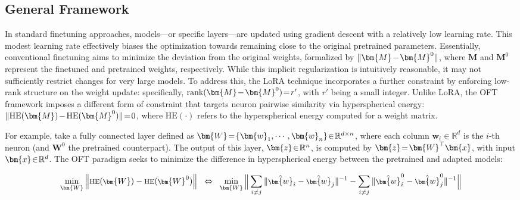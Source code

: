 \subsection{General Framework}

In standard finetuning approaches, models—or specific layers—are updated using gradient descent with a relatively low learning rate. This modest learning rate effectively biases the optimization towards remaining close to the original pretrained parameters. Essentially, conventional finetuning aims to minimize the deviation from the original weights, formalized by $\thickmuskip=2mu \medmuskip=2mu \| \bm{M} - \bm{M}^0\|$, where $\bm{M}$ and $\bm{M}^0$ represent the finetuned and pretrained weights, respectively. While this implicit regularization is intuitively reasonable, it may not sufficiently restrict changes for very large models. To address this, the LoRA technique incorporates a further constraint by enforcing low-rank structure on the weight update: specifically, $\thickmuskip=2mu \medmuskip=2mu \text{rank}(\bm{M} - \bm{M}^0)=r'$, with $r'$ being a small integer. Unlike LoRA, the OFT framework imposes a different form of constraint that targets neuron pairwise similarity via hyperspherical energy: $\thickmuskip=2mu \medmuskip=2mu \| \text{HE}(\bm{M})-\text{HE}(\bm{M}^0) \|=0$, where $\text{HE}(\cdot)$ refers to the hyperspherical energy computed for a weight matrix.

For example, take a fully connected layer defined as $\thickmuskip=2mu \medmuskip=2mu \bm{W}=\{\bm{w}_1,\cdots,\bm{w}_n\}\in\mathbb{R}^{d\times n}$, where each column $\bm{w}_i\in\mathbb{R}^{d}$ is the $i$-th neuron (and $\bm{W}^0$ the pretrained counterpart). The output of this layer, $\thickmuskip=2mu \medmuskip=2mu \bm{z}\in\mathbb{R}^n$, is computed by $\thickmuskip=2mu \medmuskip=2mu \bm{z}=\bm{W}^\top\bm{x}$, with input $\thickmuskip=2mu \medmuskip=2mu \bm{x}\in\mathbb{R}^d$. The OFT paradigm seeks to minimize the difference in hyperspherical energy between the pretrained and adapted models:

\begin{equation}\label{eq:oft_principle}
\footnotesize
\min_{\bm{W}} \left\| \text{HE}(\bm{W})-\text{HE}(\bm{W}^0)\right\|~~\Leftrightarrow~~\min_{\bm{W}} \bigg{\|} \sum_{i\neq j} \|\hat{\bm{w}}_i-\hat{\bm{w}}_j\|^{-1}-\sum_{i\neq j} \|\hat{\bm{w}}^0_i-\hat{\bm{w}}^0_j\|^{-1}\bigg{\|}
\end{equation}

